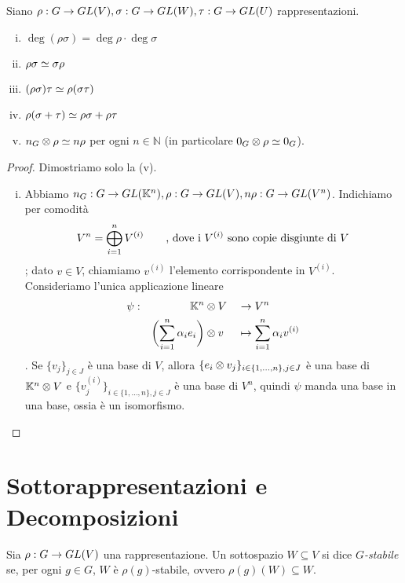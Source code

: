 \begin{proposition}
Siano $\rho:G\to GL(V),\allowbreak\sigma:G\to GL(W),\allowbreak\tau:G\to GL(U)$ rappresentazioni.
\begin{enumerate}[(i)]
\item $\deg(\rho\sigma)=\deg\rho\cdot\deg\sigma$
\item $\rho\sigma\simeq\sigma\rho$
\item $(\rho\sigma)\tau\simeq\rho(\sigma\tau)$
\item $\rho(\sigma+\tau)\simeq\rho\sigma+\rho\tau$
\item $n_G\otimes\rho\simeq n\rho$ per ogni $n\in\mathbb{N}$ (in particolare $0_G\otimes\rho\simeq 0_G$).
\end{enumerate}
\end{proposition}
\begin{proof}
Dimostriamo solo la (v).
\begin{enumerate}[(i)]
\addtocounter{enumi}{4}
\item Abbiamo $n_G:G\to GL(\mathbb{K}^n),\allowbreak\rho:G\to GL(V),\allowbreak n\rho:G\to GL(V^n)$. Indichiamo per comodità 
$$
V^n=\bigoplus_{i=1}^{n}V^{(i)}\qquad\text{, dove i $V^{(i)}$ sono copie disgiunte di $V$}
$$
; dato $v\in V$, chiamiamo $v^{(i)}$ l'elemento corrispondente in $V^{(i)}$. Consideriamo l'unica applicazione lineare
\begin{alignat*}{3}
\psi:&&\mathbb{K}^n&\otimes V&&\to V^n\\
&&\biggl(\sum_{i=1}^{n}\alpha_ie_i\biggr)&\otimes v&&\mapsto\sum_{i=1}^{n}\alpha_iv^{(i)}
\end{alignat*}
. Se $\{v_j\}_{j\in J}$ è una base di $V$, allora $\{e_i\otimes v_j\}_{i\in\{1,\ldots,n\},j\in J}$ è una base di $\mathbb{K}^n\otimes V$ e $\{v_j^{(i)}\}_{i\in\{1,\ldots,n\},j\in J}$ è una base di $V^n$, quindi $\psi$ manda una base in una base, ossia è un isomorfismo.
\end{enumerate}
\end{proof}

\section{Sottorappresentazioni e Decomposizioni}

\begin{definition}
Sia $\rho:G\to GL(V)$ una rappresentazione. Un sottospazio $W\subseteq V$ si dice \emph{$G$-stabile} se, per ogni $g\in G$, $W$ è $\rho(g)$-stabile, ovvero $\rho(g)(W)\subseteq W$.
\end{definition}

